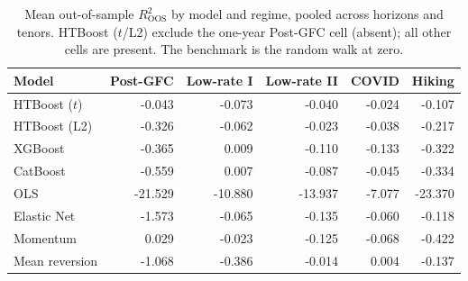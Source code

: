 \begin{table}[htbp]
\centering
\caption{Mean out-of-sample $R^2_{\text{OOS}}$ by model and regime, pooled across horizons and tenors. HTBoost ($t$/L2) exclude the one-year Post-GFC cell (absent); all other cells are present. The benchmark is the random walk at zero.}
\label{tab:oos_regime}
\footnotesize
\begin{tabular}{lrrrrr}
\toprule
Model & Post-GFC & Low-rate I & Low-rate II & COVID & Hiking \\
\midrule
HTBoost ($t$) & -0.043 & -0.073 & -0.040 & -0.024 & -0.107 \\
HTBoost (L2) & -0.326 & -0.062 & -0.023 & -0.038 & -0.217 \\
XGBoost & -0.365 & 0.009 & -0.110 & -0.133 & -0.322 \\
CatBoost & -0.559 & 0.007 & -0.087 & -0.045 & -0.334 \\
OLS & -21.529 & -10.880 & -13.937 & -7.077 & -23.370 \\
Elastic Net & -1.573 & -0.065 & -0.135 & -0.060 & -0.118 \\
Momentum & 0.029 & -0.023 & -0.125 & -0.068 & -0.422 \\
Mean reversion & -1.068 & -0.386 & -0.014 & 0.004 & -0.137 \\
\bottomrule
\end{tabular}
\end{table}
